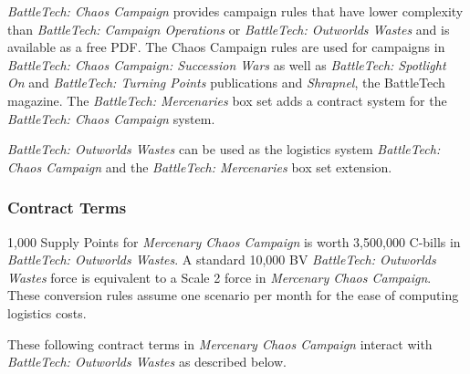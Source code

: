 \emph{BattleTech: Chaos Campaign} provides campaign rules that have lower complexity than \emph{BattleTech: Campaign Operations} or \emph{BattleTech: Outworlds Wastes} and is available as a free PDF.
The Chaos Campaign rules are used for campaigns in \emph{BattleTech: Chaos Campaign: Succession Wars} as well as \emph{BattleTech: Spotlight On} and \emph{BattleTech: Turning Points} publications and \emph{Shrapnel}, the BattleTech magazine.
The \emph{BattleTech: Mercenaries} box set adds a contract system for the \emph{BattleTech: Chaos Campaign} system.

\emph{BattleTech: Outworlds Wastes} can be used as the logistics system \emph{BattleTech: Chaos Campaign} and the \emph{BattleTech: Mercenaries} box set extension.

\subsubsection{Contract Terms}

1,000 Supply Points for \emph{Mercenary Chaos Campaign} is worth 3,500,000 C-bills in \emph{BattleTech: Outworlds Wastes}.
A standard 10,000 BV \emph{BattleTech: Outworlds Wastes} force is equivalent to a Scale 2 force in \emph{Mercenary Chaos Campaign}.
These conversion rules assume one scenario per month for the ease of computing logistics costs.

These following contract terms in \emph{Mercenary Chaos Campaign} interact with \emph{BattleTech: Outworlds Wastes} as described below.

